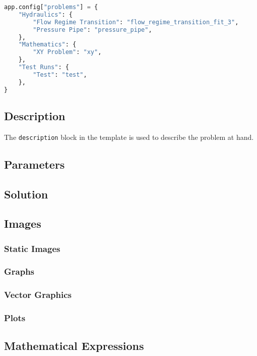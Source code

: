 \begin{lstlisting}[language=python]
app.config["problems"] = {
    "Hydraulics": {
        "Flow Regime Transition": "flow_regime_transition_fit_3",
        "Pressure Pipe": "pressure_pipe",
    },
    "Mathematics": {
        "XY Problem": "xy",
    },
    "Test Runs": {
        "Test": "test",
    },
}
\end{lstlisting}

\subsection{Description}

The \verb+description+ block in the template is used to describe the problem at hand.

\subsection{Parameters}

\subsection{Solution}

\subsection{Images}

\subsubsection{Static Images}

\subsubsection{Graphs}

\subsubsection{Vector Graphics}

\subsubsection{Plots}

\subsection{Mathematical Expressions}


